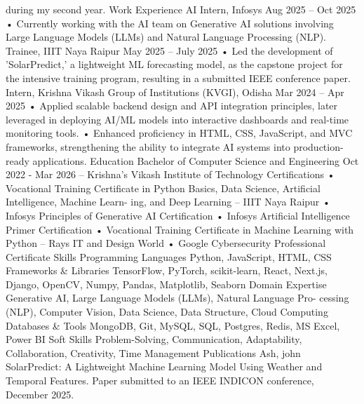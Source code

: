 during my second year.
Work Experience
AI Intern, Infosys Aug 2025 – Oct 2025
• Currently working with the AI team on Generative AI solutions involving Large Language Models
(LLMs) and Natural Language Processing (NLP).
Trainee, IIIT Naya Raipur May 2025 – July 2025
• Led the development of ’SolarPredict,’ a lightweight ML forecasting model, as the capstone project for
the intensive training program, resulting in a submitted IEEE conference paper.
Intern, Krishna Vikash Group of Institutions (KVGI), Odisha Mar 2024 – Apr 2025
• Applied scalable backend design and API integration principles, later leveraged in deploying AI/ML
models into interactive dashboards and real-time monitoring tools.
• Enhanced proficiency in HTML, CSS, JavaScript, and MVC frameworks, strengthening the ability to
integrate AI systems into production-ready applications.
Education
Bachelor of Computer Science and Engineering Oct 2022 - Mar 2026
– Krishna’s Vikash Institute of Technology
Certifications
• Vocational Training Certificate in Python Basics, Data Science, Artificial Intelligence, Machine Learn-
ing, and Deep Learning – IIIT Naya Raipur
• Infosys Principles of Generative AI Certification
• Infosys Artificial Intelligence Primer Certification
• Vocational Training Certificate in Machine Learning with Python – Rays IT and Design World
• Google Cybersecurity Professional Certificate
Skills
Programming Languages Python, JavaScript, HTML, CSS
Frameworks & Libraries TensorFlow, PyTorch, scikit-learn, React, Next.js, Django, OpenCV,
Numpy, Pandas, Matplotlib, Seaborn
Domain Expertise Generative AI, Large Language Models (LLMs), Natural Language Pro-
cessing (NLP), Computer Vision, Data Science, Data Structure, Cloud
Computing
Databases & Tools MongoDB, Git, MySQL, SQL, Postgres, Redis, MS Excel, Power BI
Soft Skills Problem-Solving, Communication, Adaptability, Collaboration, Creativity,
Time Management
Publications
Ash, john SolarPredict: A Lightweight Machine Learning Model Using Weather and Temporal Features.
Paper submitted to an IEEE INDICON conference, December 2025.